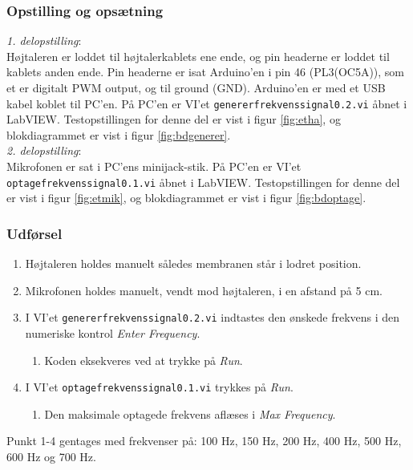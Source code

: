 		\subsubsection{Opstilling og opsætning}
		\textit{1. delopstilling}:\\
		Højtaleren er loddet til højtalerkablets ene ende, og pin headerne er loddet til kablets anden ende. 
		Pin headerne er isat Arduino'en i pin 46 (PL3(OC5A)), som et er digitalt PWM output, og til ground (GND). 
		Arduino'en er med et USB kabel koblet til PC'en. 		
		På PC'en er VI'et \texttt{genererfrekvenssignal0.2.vi} åbnet i LabVIEW. Testopstillingen for denne del er vist i figur \ref{fig:etha}, og blokdiagrammet er vist i figur \ref{fig:bdgenerer}.\\ 
 
		\textit{2. delopstilling}:\\
		Mikrofonen er sat i PC'ens minijack-stik. På PC'en er VI'et \texttt{optagefrekvenssignal0.1.vi} åbnet i LabVIEW. Testopstillingen for denne del er vist i figur \ref{fig:etmik}, og blokdiagrammet er vist i figur \ref{fig:bdoptage}.\\ 
		
		\subsubsection{Udførsel}
			\begin{enumerate}
				\item Højtaleren holdes manuelt således membranen står i lodret position. 
				\item Mikrofonen holdes manuelt, vendt mod højtaleren, i en afstand på 5 cm. 
				\item I VI'et \texttt{genererfrekvenssignal0.2.vi} indtastes den ønskede frekvens i den numeriske kontrol \textit{Enter Frequency}. 
					\begin{enumerate}
						\item Koden eksekveres ved at trykke på \textit{Run}. 
					\end{enumerate} 
				\item I VI'et \texttt{optagefrekvenssignal0.1.vi} trykkes på \textit{Run}. 
					\begin{enumerate}
						\item Den maksimale optagede frekvens aflæses i \textit{Max Frequency}. 
					\end{enumerate}	  
			\end{enumerate}
			
			Punkt 1-4 gentages med frekvenser på: 100 Hz, 150 Hz, 200 Hz, 400 Hz, 500 Hz, 600 Hz og 700 Hz. 
			
